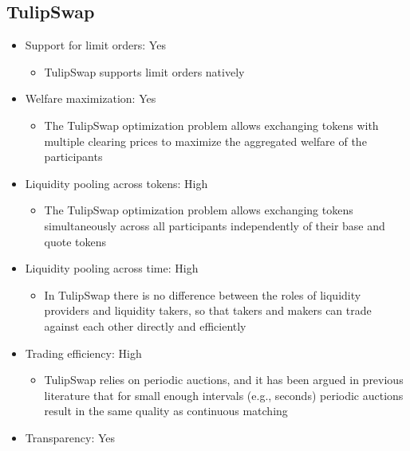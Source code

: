 \documentclass[11pt, reqno]{amsart}
\theoremstyle{definition}
\theoremstyle{remark}
\begin{document}
\subsection{TulipSwap}

\begin{itemize}

    \item Support for limit orders: Yes
          \begin{itemize}
              \item TulipSwap supports limit orders natively
          \end{itemize}
    \item Welfare maximization: Yes
          \begin{itemize}
              \item The TulipSwap optimization problem allows exchanging tokens with multiple
                    clearing prices to maximize the aggregated welfare of the participants
          \end{itemize}
    \item Liquidity pooling across tokens: High
          \begin{itemize}
              \item The TulipSwap optimization problem allows exchanging tokens simultaneously across
                    all participants independently of their base and quote tokens
          \end{itemize}
    \item Liquidity pooling across time: High
          \begin{itemize}
              \item In TulipSwap there is no difference between the roles of
                    liquidity providers and liquidity takers, so that takers and makers
                    can trade against each other directly and efficiently
          \end{itemize}
    \item Trading efficiency: High
          \begin{itemize}
              \item TulipSwap relies on periodic auctions, and it has been argued
                    in previous literature that for small enough intervals (e.g.,
                    seconds) periodic auctions result in the same quality as
                    continuous matching \cite{BuCrSh15}
          \end{itemize}
    \item Transparency: Yes

\end{itemize}
\end{document}
